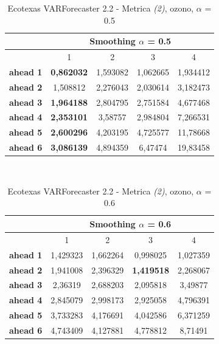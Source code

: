 \documentclass[12pt,a4paper,oneside,openright]{book}
\begin{document}
\medskip

\begin{table}[H]
\centering
\begin{tabular}{|c|c|c|c|c|}
\hline
 & \multicolumn{4}{|c|}{Smoothing $\alpha$ = 0.5} \\
\hline
& 1 & 2 & 3 & 4 \\
\hline
\textbf{ahead 1} & \textbf{0,862032} & 1,593082 & 1,062665 & 1,934412\\
\hline
\textbf{ahead 2} & 1,508812 & 2,276043 & 2,030614 & 3,182473\\ 
\hline
\textbf{ahead 3} & \textbf{1,964188} & 2,804795 & 2,751584 & 4,677468\\
\hline
\textbf{ahead 4} & \textbf{2,353101} & 3,58757 & 2,984804 & 7,266531\\ 
\hline
\textbf{ahead 5} & \textbf{2,600296} & 4,203195 & 4,725577 & 11,78668\\
\hline
\textbf{ahead 6} & \textbf{3,086139} & 4,894359 & 6,47474 & 19,83458\\ 
\hline
\end{tabular} \\
\caption{Ecotexas VARForecaster 2.2 - Metrica \textit{(2)}, ozono, $\alpha$ = 0.5}
\end{table}

\medskip

\begin{table}[H]
\centering
\begin{tabular}{|c|c|c|c|c|}
\hline
 & \multicolumn{4}{|c|}{Smoothing $\alpha$ = 0.6} \\
\hline
& 1 & 2 & 3 & 4 \\
\hline
\textbf{ahead 1} & 1,429323 & 1,662264 & 0,998025 & 1,027359\\
\hline
\textbf{ahead 2} & 1,941008 & 2,396329 & \textbf{1,419518} & 2,268067\\ 
\hline
\textbf{ahead 3} & 2,36319 & 2,688203 & 2,095818 & 3,49877\\
\hline
\textbf{ahead 4} & 2,845079 & 2,998173 & 2,925058 & 4,796391\\ 
\hline
\textbf{ahead 5} & 3,733283 & 4,176691 & 4,042586 & 6,371259\\
\hline
\textbf{ahead 6} & 4,743409 & 4,127881 & 4,778812 & 8,71491\\ 
\hline
\end{tabular} \\
\caption{Ecotexas VARForecaster 2.2 - Metrica \textit{(2)}, ozono, $\alpha$ = 0.6}
\end{table}
\end{document}
